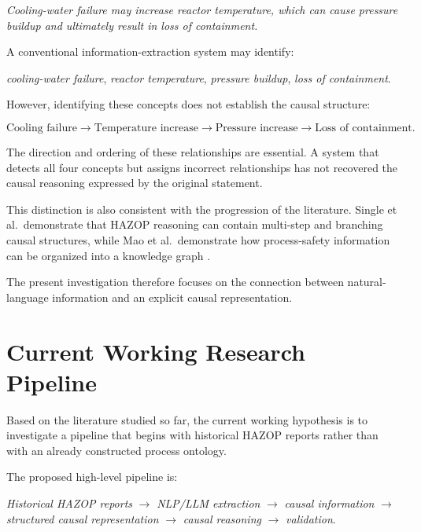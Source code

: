 \begin{center}
\emph{Cooling-water failure may increase reactor temperature, which can cause
pressure buildup and ultimately result in loss of containment.}
\end{center}

A conventional information-extraction system may identify:

\begin{center}
\textit{cooling-water failure}, \quad
\textit{reactor temperature}, \quad
\textit{pressure buildup}, \quad
\textit{loss of containment}.
\end{center}

However, identifying these concepts does not establish the causal structure:

\begin{center}
\[
\text{Cooling failure}
\rightarrow
\text{Temperature increase}
\rightarrow
\text{Pressure increase}
\rightarrow
\text{Loss of containment}.
\]
\end{center}

The direction and ordering of these relationships are essential. A system
that detects all four concepts but assigns incorrect relationships has not
recovered the causal reasoning expressed by the original statement.

This distinction is also consistent with the progression of the literature.
Single et al.\ demonstrate that HAZOP reasoning can contain multi-step and
branching causal structures, while Mao et al.\ demonstrate how process-safety
information can be organized into a knowledge graph
\cite{single2020ontologyhazop,mao2020processsafetykg}.

The present investigation therefore focuses on the connection between
natural-language information and an explicit causal representation.

\section{Current Working Research Pipeline}

Based on the literature studied so far, the current working hypothesis is to
investigate a pipeline that begins with historical HAZOP reports rather than
with an already constructed process ontology.

The proposed high-level pipeline is:

\begin{center}
\emph{Historical HAZOP reports}
$\rightarrow$
\emph{NLP/LLM extraction}
$\rightarrow$
\emph{causal information}
$\rightarrow$
\emph{structured causal representation}
$\rightarrow$
\emph{causal reasoning}
$\rightarrow$
\emph{validation}.
\end{center}


